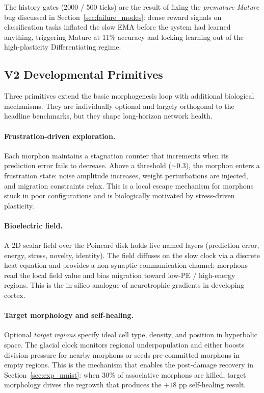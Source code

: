 The history gates (2000 / 500 ticks) are the result of fixing the \emph{premature Mature} bug discussed in Section~\ref{sec:failure_modes}: dense reward signals on classification tasks inflated the slow EMA before the system had learned anything, triggering Mature at 11\% accuracy and locking learning out of the high-plasticity Differentiating regime.

\subsection{V2 Developmental Primitives}

Three primitives extend the basic morphogenesis loop with additional biological mechanisms. They are individually optional and largely orthogonal to the headline benchmarks, but they shape long-horizon network health.

\paragraph{Frustration-driven exploration.}
Each morphon maintains a stagnation counter that increments when its prediction error fails to decrease. Above a threshold ($\sim$0.3), the morphon enters a frustration state: noise amplitude increases, weight perturbations are injected, and migration constraints relax. This is a local escape mechanism for morphons stuck in poor configurations and is biologically motivated by stress-driven plasticity.

\paragraph{Bioelectric field.}
A 2D scalar field over the Poincar\'e disk holds five named layers (prediction error, energy, stress, novelty, identity). The field diffuses on the slow clock via a discrete heat equation and provides a non-synaptic communication channel: morphons read the local field value and bias migration toward low-PE / high-energy regions. This is the in-silico analogue of neurotrophic gradients in developing cortex.

\paragraph{Target morphology and self-healing.}
Optional \emph{target regions} specify ideal cell type, density, and position in hyperbolic space. The glacial clock monitors regional underpopulation and either boosts division pressure for nearby morphons or seeds pre-committed morphons in empty regions. This is the mechanism that enables the post-damage recovery in Section~\ref{sec:exp_mnist}: when 30\% of associative morphons are killed, target morphology drives the regrowth that produces the $+18$ pp self-healing result.

